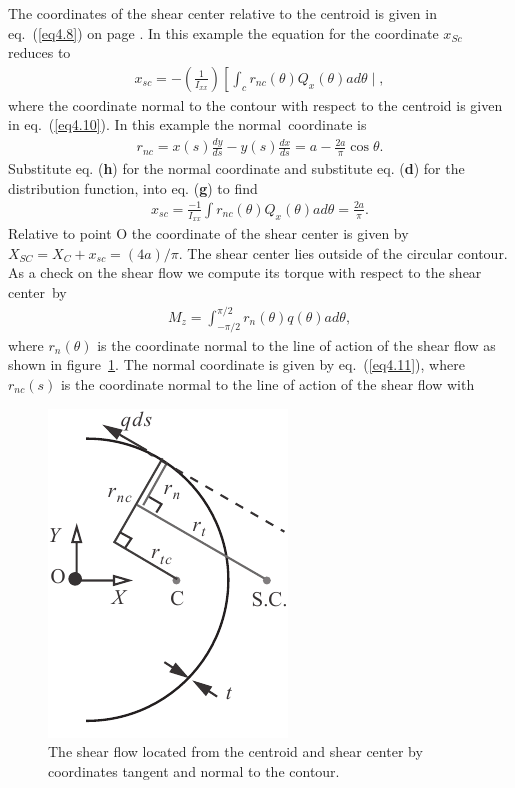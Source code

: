 \documentclass{AeroStructure-ERJohnson}
\begin{document}
\begin{example*}
The coordinates of the shear center relative to the centroid is given in eq.~(\ref{eq4.8}) on page \pageref{eq4.8}. In this example the equation for the coordinate $x_{S c}$ reduces to
\begin{align}\label{ex4.7g}
x_{s c}=-\left(\frac{1}{I_{x x}}\right)\left[\int_{c} r_{n c}(\theta) Q_{x}(\theta) a d \theta \mid\right.\!,\end{align}
\noindent
where the coordinate normal to the contour with respect to the centroid is given in eq.~(\ref{eq4.10}). In this example the normal~co\-ordi\-nate is
\begin{align}\label{ex4.7h}
r_{n c}=x(s) \frac{d y}{d s}-y(s) \frac{d x}{d s}=a-\frac{2 a}{\pi} \cos \theta.\end{align}
Substitute eq. (\textbf{h}) for the normal coordinate and substitute eq. (\textbf{d}) for the distribution function, into eq. (\textbf{g}) to find
\begin{align*}x_{s c}=\frac{-1}{I_{x x}} \int r_{n c}(\theta) Q_{x}(\theta) a d \theta=\frac{2 a}{\pi}.\end{align*}
Relative to point O the coordinate of the shear center is given by $X_{S C}=X_{C}+x_{s c}=(4 a)/\pi$. The shear center lies outside of the circular contour.
\noindent As a check on the shear flow we compute its torque with respect to the shear center~by
\begin{align}\label{ex4.7i}
M_{z}=\int_{-\pi/2}^{\pi/2} r_{n}(\theta) q(\theta) ad \theta,\end{align}
where $r_{n}(\theta)$ is the coordinate normal to the line of action of the shear flow as shown in figure~\ref{fig4.26}. The normal coordinate is given by eq.~(\ref{eq4.11}), where $r_{n c}(s)$ is the coordinate normal to the line of action of the shear flow\vspace*{10pt} with{\parfillskip=0pt\par}
\pagebreak
\begin{figure}
\vspace*{-8pt}
\includegraphics{Figure_4-26.pdf}
\vspace*{-18pt}
\caption{The shear flow located from the centroid and shear center by coordinates tangent and normal to the contour.\label{fig4.26}}
\vspace*{6pt}
\end{figure}


\end{example*}
\end{document}

